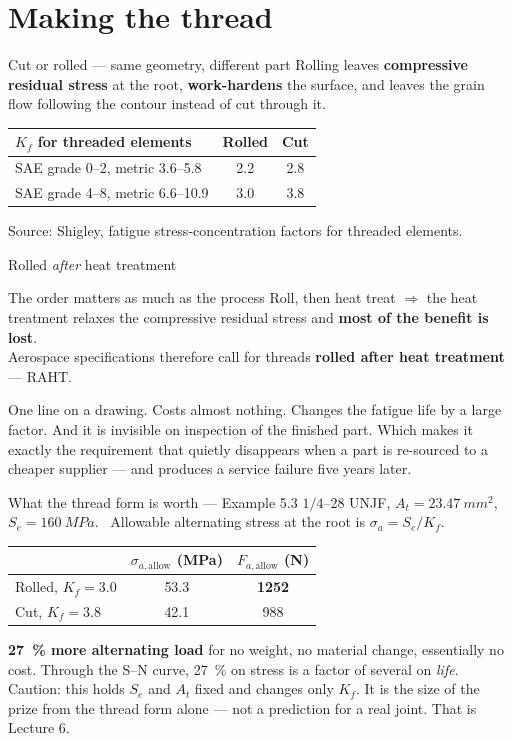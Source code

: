 \documentclass[aspectratio=169,10pt]{beamer}
\begin{document}
\section{Making the thread}

\begin{frame}{Cut or rolled --- same geometry, different part}
Rolling leaves \textbf{compressive residual stress} at the root, \textbf{work-hardens} the surface, and
leaves the grain flow following the contour instead of cut through it.
\vfill
\centering\small
\begin{tabular}{@{}lcc@{}}
\toprule
$K_f$ for threaded elements & \textbf{Rolled} & \textbf{Cut}\\
\midrule
SAE grade 0--2, metric 3.6--5.8 & 2.2 & 2.8\\
SAE grade 4--8, metric 6.6--10.9 & 3.0 & 3.8\\
\bottomrule
\end{tabular}
\vfill
\raggedright
{\small Source: Shigley, fatigue stress-concentration factors for threaded elements.}
\end{frame}

\begin{frame}{Rolled \emph{after} heat treatment}
\begin{alertblock}{The order matters as much as the process}
Roll, then heat treat $\Rightarrow$ the heat treatment relaxes the compressive residual stress and
\textbf{most of the benefit is lost}.\\[6pt]
Aerospace specifications therefore call for threads \textbf{rolled after heat treatment} --- RAHT.
\end{alertblock}
\vfill
One line on a drawing. Costs almost nothing. Changes the fatigue life by a large factor.
\vfill
\alert{And it is invisible on inspection of the finished part.}
\vfill
{\small Which makes it exactly the requirement that quietly disappears when a part is re-sourced to a
cheaper supplier --- and produces a service failure five years later.}
\end{frame}

\begin{frame}{What the thread form is worth --- Example 5.3}
$1/4$--28 UNJF, $A_t = \SI{23.47}{mm^2}$, $S_e = \SI{160}{MPa}$. \ Allowable alternating stress at the
root is $\sigma_a = S_e/K_f$.
\vfill
\centering
\begin{tabular}{@{}lcc@{}}
\toprule
 & $\sigma_{a,\text{allow}}$ (\si{MPa}) & $F_{a,\text{allow}}$ (\si{N})\\
\midrule
Rolled, $K_f=3.0$ & 53.3 & \textbf{1252}\\
Cut, $K_f=3.8$ & 42.1 & 988\\
\bottomrule
\end{tabular}
\vfill
\raggedright
\textbf{\SI{27}{\percent} more alternating load} for no weight, no material change, essentially no cost.
\vfill
{\small Through the S--N curve, \SI{27}{\percent} on stress is a factor of several on \emph{life}.
Caution: this holds $S_e$ and $A_t$ fixed and changes only $K_f$. It is the size of the prize from the
thread form alone --- not a prediction for a real joint. That is Lecture 6.}
\end{frame}
\end{document}

